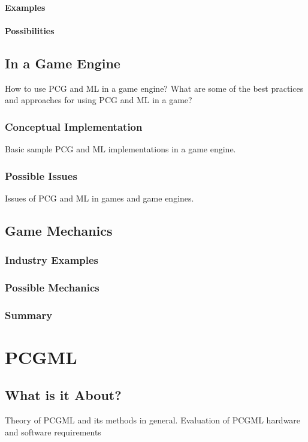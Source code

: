 \documentclass[MGS,Master,english]{twbook}%
\begin{document}
\subsubsection{Examples}
\subsubsection{Possibilities}

\section{In a Game Engine}
How to use PCG and ML in a game engine? What are some of the best practices and approaches for using PCG and ML in a game?

\subsection{Conceptual Implementation}
Basic sample PCG and ML implementations in a game engine.

\subsection{Possible Issues}
Issues of PCG and ML in games and game engines.


\section{Game Mechanics}
\subsection{Industry Examples}
\subsection{Possible Mechanics}
\subsection{Summary}


%
%
\clearpage
\chapter{\acl{PCGML}}
\section{What is it About?}
Theory of PCGML and its methods in general.
Evaluation of PCGML hardware and software requirements
\end{document}

